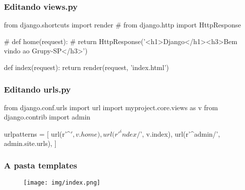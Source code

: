 \documentclass[aspectratio=169]{beamer}
\begin{document}
{\begin{frame}[fragile]\frametitle{Editando views.py}

\begin{pythoncode}
from django.shortcuts import render
# from django.http import HttpResponse

# def home(request):
#     return HttpResponse('<h1>Django</h1><h3>Bem vindo ao Grupy-SP</h3>')

def index(request):
    return render(request, 'index.html')
\end{pythoncode}


\end{frame}

\begin{frame}[fragile]\frametitle{Editando urls.py}

\begin{pythoncode}
from django.conf.urls import url
import myproject.core.views as v
from django.contrib import admin

urlpatterns = [
    url(r'^$', v.home),
    url(r'^index/$', v.index),
    url(r'^admin/', admin.site.urls),
]
\end{pythoncode}


\end{frame}


\begin{frame}\frametitle{A pasta templates}


\end{frame}

\begin{frame}

    \begin{figure}[h]
      \centering
        \texttt{[image: img/index.png]}
    \end{figure}

\end{frame}


}
\end{document}

